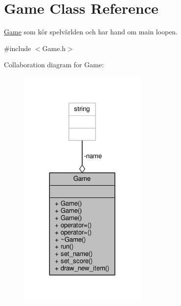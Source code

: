 \hypertarget{classGame}{\section{Game Class Reference}
\label{classGame}
}


\hyperlink{classGame}{Game} som kör spelvärlden och har hand om main loopen.  




{\ttfamily \#include $<$Game.\+h$>$}



Collaboration diagram for Game\+:\nopagebreak
\begin{figure}[H]
\begin{center}
\leavevmode
\includegraphics[width=180pt]{classGame__coll__graph}
\end{center}
\end{figure}
